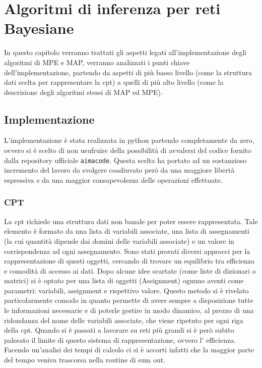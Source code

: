 \chapter{Algoritmi di inferenza per reti Bayesiane}
In questo capitolo verranno trattati gli aspetti legati all'implementazione degli algoritmi di MPE e MAP, verranno analizzati i punti chiave dell’implementazione, partendo da aspetti di più basso livello (come la struttura dati scelta per rappresentare la cpt) a quelli di più alto livello (come la descrizione degli algoritmi stessi di MAP ed MPE).

\section{Implementazione}
L’implementazione è stata realizzata in python partendo completamente da zero, ovvero si è scelto di non usufruire della possibilità di avvalersi del codice fornito dalla repository ufficiale \texttt{aimacode}. Questa scelta ha portato ad un sostanzioso incremento del lavoro da svolgere coadiuvato però da una maggiore libertà espressiva e da una maggior consapevolezza delle operazioni effettuate.

\subsection{CPT}
La cpt richiede una struttura dati non banale per poter essere rappresentata. Tale elemento è formato da una lista di variabili associate, una lista di assegnamenti (la cui quantità dipende dai domini delle variabili associate) e un valore in corrispondenza ad ogni assegnamento. Sono stati provati diversi approcci per la rappresentazione di questi oggetti, cercando di trovare un equilibrio tra efficienza e comodità di accesso ai dati. Dopo alcune idee scartate (come liste di dizionari o matrici) si è optato per una lista di oggetti (Assignment) ognuno aventi come parametri: variabili, assignment e rispettivo valore. Questo metodo si è rivelato particolarmente comodo in quanto permette di avere sempre a disposizione tutte le informazioni necessarie e di poterle gestire in modo dinamico, al prezzo di una ridondanza del nome delle variabili associate, che viene ripetuto per ogni riga della cpt. Quando si è passati a lavorare su reti più grandi si è però subito palesato il limite di questo sistema di rappresentazione, ovvero l’ efficienza. Facendo un’analisi dei tempi di calcolo ci si è accorti infatti che la maggior parte del tempo veniva trascorsa nella routine di sum out.

